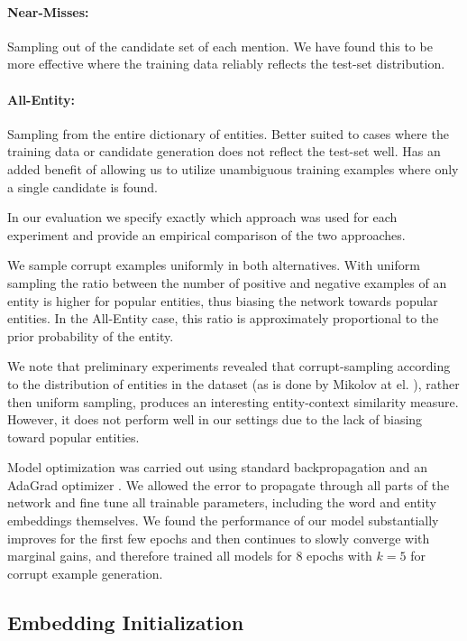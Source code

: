 \documentclass[11pt]{article}
\begin{document}
	\paragraph{Near-Misses:} 
	Sampling out of the candidate set of each mention. We have found this to be more effective where the training data reliably reflects the test-set distribution.
	
	\paragraph{All-Entity:} 
	Sampling from the entire dictionary of entities. Better suited to cases where the training data or candidate generation does not reflect the test-set well. Has an added benefit of allowing us to utilize unambiguous training examples where only a single candidate is found.
	
	In our evaluation we specify exactly which approach was used for each experiment and provide an empirical comparison of the two approaches.
	
	We sample corrupt examples uniformly in both alternatives. With uniform sampling the ratio between the number of positive and negative examples of an entity is higher for popular entities, thus biasing the network towards popular entities. In the All-Entity case, this ratio is approximately proportional to the prior probability of the entity. 
	
	We note that preliminary experiments revealed that corrupt-sampling according to the distribution of entities in the dataset (as is done by Mikolov at el. ), rather then uniform sampling, produces an interesting entity-context similarity measure. However, it does not perform well in our settings due to the lack of biasing toward popular entities.
	
	Model optimization was carried out using standard backpropagation and an AdaGrad optimizer \cite{duchi2011adaptive}. We allowed the error to propagate through all parts of the network and fine tune all trainable parameters, including the word and entity embeddings themselves. We found the performance of our model substantially improves for the first few epochs and then continues to slowly converge with marginal gains, and therefore trained all models for $8$ epochs with $k=5$ for corrupt example generation. 
	
	\subsection{Embedding Initialization}
	
\end{document}
